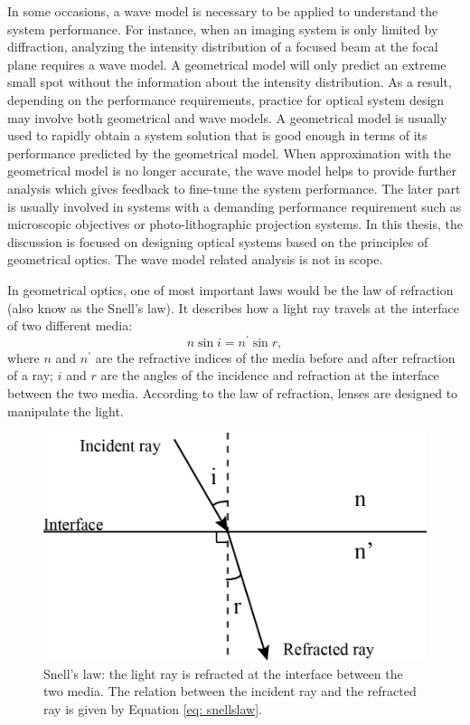  
In some occasions, a wave model is necessary to be applied to understand the system performance. For instance, when an imaging system is only limited by diffraction, analyzing the intensity distribution of a focused beam at the focal plane requires a wave model. A geometrical model will only predict an extreme small spot without the information about the intensity distribution. As a result, depending on the performance requirements, practice for optical system design may involve both geometrical and wave models. A geometrical model is usually used to rapidly obtain a system solution that is good enough in terms of its performance predicted by the geometrical model. When approximation with the geometrical model is no longer accurate, the wave model helps to provide further analysis which gives feedback to fine-tune the system performance. The later part is usually involved in systems with a demanding performance requirement such as microscopic objectives or photo-lithographic projection systems. In this thesis, the discussion is focused on designing optical systems based on the principles of geometrical optics. The wave model related analysis is not in scope.  


In geometrical optics, one of most important laws would be the law of refraction (also know as the Snell's law). It describes how a light ray travels at the interface of two different media:
\begin{equation}
n \sin i = n^\prime \sin r,
\label{eq: snellslaw}
\end{equation}
where $n$ and $n^\prime$ are the refractive indices of the media before and after refraction of a ray; $i$ and $r$ are the angles of the incidence and refraction at the interface between the two media. According to the law of refraction, lenses are designed to manipulate the light.
\begin{figure}
    \centering
    \includegraphics[scale=0.65]{chapter-1/figures/snellslaw.png}
    \caption{Snell's law: the light ray is refracted at the interface between the two media. The relation between the incident ray and the refracted ray is given by Equation \ref{eq: snellslaw}.}
    \label{fig: snellslaw}
\end{figure} 

